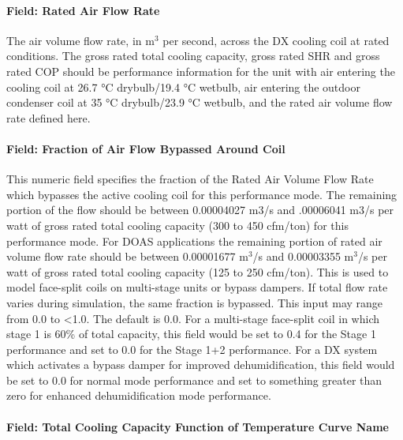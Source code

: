 \paragraph{Field: Rated Air Flow Rate}\label{field-rated-air-flow-rate-3}

The air volume flow rate, in m\(^{3}\) per second, across the DX cooling coil at rated conditions. The gross rated total cooling capacity, gross rated SHR and gross rated COP should be performance information for the unit with air entering the cooling coil at 26.7 °C drybulb/19.4 °C wetbulb, air entering the outdoor condenser coil at 35 °C drybulb/23.9 °C wetbulb, and the rated air volume flow rate defined here.

\paragraph{Field: Fraction of Air Flow Bypassed Around Coil}\label{field-fraction-of-air-flow-bypassed-around-coil}

This numeric field specifies the fraction of the Rated Air Volume Flow Rate which bypasses the active cooling coil for this performance mode. The remaining portion of the flow should be between 0.00004027 m3/s and .00006041 m3/s per watt of gross rated total cooling capacity (300 to 450 cfm/ton) for this performance mode. For DOAS applications the remaining portion of rated air volume flow rate should be between 0.00001677 m\(^{3}\)/s and 0.00003355 m\(^{3}\)/s per watt of gross rated total cooling capacity (125 to 250 cfm/ton). This is used to model face-split coils on multi-stage units or bypass dampers. If total flow rate varies during simulation, the same fraction is bypassed. This input may range from 0.0 to \textless{}1.0. The default is 0.0. For a multi-stage face-split coil in which stage 1 is 60\% of total capacity, this field would be set to 0.4 for the Stage 1 performance and set to 0.0 for the Stage 1+2 performance. For a DX system which activates a bypass damper for improved dehumidification, this field would be set to 0.0 for normal mode performance and set to something greater than zero for enhanced dehumidification mode performance.

\paragraph{Field: Total Cooling Capacity Function of Temperature Curve Name}\label{field-total-cooling-capacity-function-of-temperature-curve-name-2}

